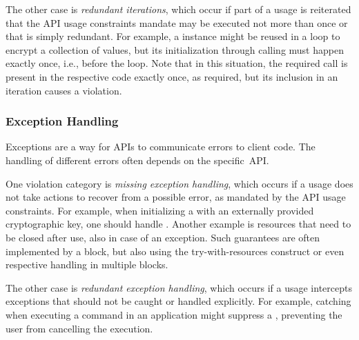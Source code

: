 The other case is \emph{redundant iterations}, which occur if part of a usage is reiterated that the API usage constraints mandate may be executed not more than once or that is simply redundant.
For example, a  instance might be reused in a loop to encrypt a collection of values, but its initialization through calling  must happen exactly once, i.e., before the loop.
Note that in this situation, the required call is present in the respective code exactly once, as required, but its inclusion in an iteration causes a violation.


\subsubsection*{Exception Handling}

Exceptions are a way for APIs to communicate errors to client code.
The handling of different errors often depends on the specific~API.

One violation category is \emph{missing exception handling}, which occurs if a usage does not take actions to recover from a possible error, as mandated by the API usage constraints.
For example, when initializing a  with an externally provided cryptographic key, one should handle .
Another example is resources that need to be closed after use, also in case of an exception.
Such guarantees are often implemented by a  block, but also using the try-with-resources construct or even respective handling in multiple  blocks.

The other case is \emph{redundant exception handling}, which occurs if a usage intercepts exceptions that should not be caught or handled explicitly.
For example, catching  when executing a command in an application might suppress a , preventing the user from cancelling the execution.
